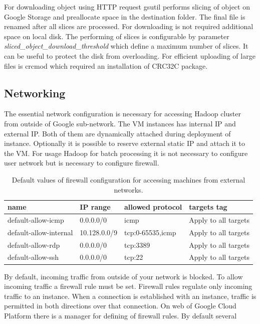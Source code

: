 \documentclass[a4paper,12pt,oneside]{report}
\begin{document}
	For downloading object using HTTP request gsutil performs slicing of object on
	Google Storage  and preallocate space in the destination folder. 
	The final file is renamed after all slices are	processed. For downloading 
	is not required additional space on local disk. The performing of slices is configurable by parameter
	\textit{sliced\_object\_download\_threshold} which 	define a maximum number of slices. It can be 
	useful to protect the disk from overloading. For efficient uploading of large
	files is crcmod which required 	an installation  of CRC32C package. 
	
	\subsection{Networking}
	The essential network configuration is necessary  for accessing Hadoop cluster
	from outside of Google sub-network. The VM instances has internal IP and
	external IP. Both of them are dynamically attached during deployment of
	instance. Optionally it is possible to reserve external static IP and attach it to
	the VM.  For usage Hadoop for batch processing it is not necessary to configure
	user network but is necessary to configure firewall. 
	
	\begin{table}[!htbp]
		\centering
		\begin{scriptsize}
			\begin{tabular}{@{}|l|l|l|l|@{}}
				\toprule
				name                   & IP range     & allowed protocol & targets tag         
				\\ \midrule  \midrule
				default-allow-icmp     & 0.0.0.0/0    & icmp             & Apply to all targets
				\\ \midrule
				default-allow-internal & 10.128.0.0/9 & tcp:0-65535,icmp & Apply to all targets
				\\ \midrule
				default-allow-rdp      & 0.0.0.0/0    & tcp:3389         & Apply to all targets
				\\ \midrule
				default-allow-ssh      & 0.0.0.0/0    & tcp:22           & Apply to all targets
				\\ \bottomrule
			\end{tabular}
		\end{scriptsize}
		\caption{Default values of firewall configuration for accessing machines from external networks.}
		\label{firewall}
	\end{table}
	By default, incoming traffic from outside of your network is blocked. To allow
	incoming traffic a firewall rule must be set. Firewall rules regulate only incoming
	traffic to an instance. When a connection is established with an instance,
	traffic is permitted in both directions over that connection. On web of Google
	Cloud Platform there is a manager for defining of firewall rules. By default several
\end{document}

